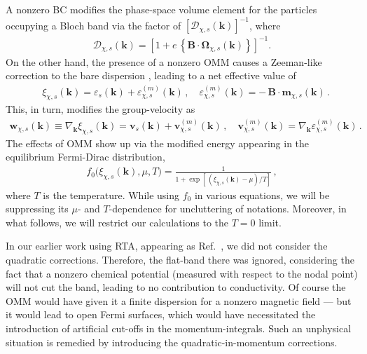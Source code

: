 \documentclass[aps,prb,onecolumn,nofootinbib,citeautoscript,10pt]{revtex4-2}
\begin{document}
A nonzero BC modifies the phase-space volume element for the particles occupying a Bloch band via the factor of $
\left [{\mathcal D}_{ \chi, s }  (\boldsymbol k)\right]^{-1}$, where
\begin{align}
{\mathcal D}_{ \chi, s }  (\boldsymbol k) = \left [1 
+ e \,  \left \lbrace 
{\boldsymbol B} \cdot \boldsymbol{\Omega }_{ \chi, s }  (\boldsymbol k)
\right \rbrace  \right ]^{-1}.
\end{align}
On the other hand, the presence of a nonzero OMM causes a Zeeman-like correction to the bare dispersion \cite{xiao_review}, leading to a net effective value of
\begin{align}
\label{eqmodi}
& \xi_{ \chi, s } (\boldsymbol k) 
= \varepsilon_ s  (\boldsymbol k) + \varepsilon_{\chi, s}^{ (m) }  (\boldsymbol k) \, ,\quad 
\varepsilon_{\chi, s}^{(m)}   (\boldsymbol k) 
= - \,{\boldsymbol B} \cdot \boldsymbol{m }_{\chi, s}  (\boldsymbol k) \,.
\end{align}
This, in turn, modifies the group-velocity as
\begin{align}
{\boldsymbol   w}_{ \chi, s } ({\boldsymbol k} ) \equiv 
 \nabla_{{\boldsymbol k}}   \xi_{ \chi, s } ({\boldsymbol k})
 = {\boldsymbol   v}_s ({\boldsymbol k} ) + {\boldsymbol  v}^{(m)}_{\chi, s} ({\boldsymbol k} ) \,,
\quad {\boldsymbol v}^{(m)}_{\chi, s} ({\boldsymbol k} )
= \nabla_{{\boldsymbol k}} \varepsilon_{\chi, s}^{(m)}   (\boldsymbol k) \,.
\end{align}
The effects of OMM show up via the modified energy appearing in the equilibrium Fermi-Dirac distribution,
\begin{align}
\label{eqdist}
	f_0 \big (\xi_{\chi, s} (\boldsymbol k) , \mu, T \big )
= \frac{1}
{ 1 + \exp [ \, 
\left(  \xi_{\chi, s} (\boldsymbol k)-\mu \right) /T  ]}\,,
\end{align}
where $T $ is the temperature.
While using $f_0$ in various equations, we will be suppressing its $\mu$- and $ T $-dependence for uncluttering of notations. Moreover, in what follows, we will restrict our calculations to the $ T = 0$ limit.

In our earlier work using RTA, appearing as Ref.~\cite{ips-spin1-ph}, we did not consider the quadratic corrections. Therefore, the flat-band there was ignored, considering the fact that a nonzero chemical potential (measured with respect to the nodal point) will not cut the band, leading to no contribution to conductivity. Of course the OMM would have given it a finite dispersion for a nonzero magnetic field --- but it would lead to open Fermi surfaces, which would have necessitated the introduction of artificial cut-offs in the momentum-integrals. Such an unphysical situation is remedied by introducing the quadratic-in-momentum corrections.
\end{document}
